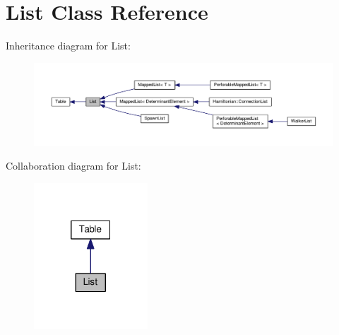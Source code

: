 \hypertarget{classList}{}\section{List Class Reference}
\label{classList}


Inheritance diagram for List\+:\nopagebreak
\begin{figure}[H]
\begin{center}
\leavevmode
\includegraphics[width=350pt]{classList__inherit__graph}
\end{center}
\end{figure}


Collaboration diagram for List\+:\nopagebreak
\begin{figure}[H]
\begin{center}
\leavevmode
\includegraphics[width=121pt]{classList__coll__graph}
\end{center}
\end{figure}

